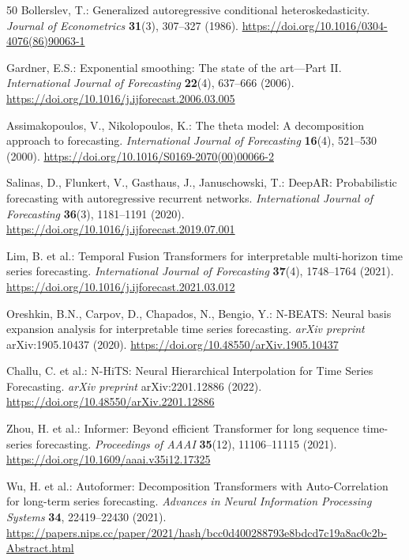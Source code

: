 \documentclass[sn-mathphys-num,pdflatex]{sn-jnl}
\begin{document}
\begin{thebibliography}{50}
Bollerslev, T.:
Generalized autoregressive conditional heteroskedasticity.
\textit{Journal of Econometrics} \textbf{31}(3), 307--327 (1986).
\url{https://doi.org/10.1016/0304-4076(86)90063-1}

Gardner, E.S.:
Exponential smoothing: The state of the art—Part II.
\textit{International Journal of Forecasting} \textbf{22}(4), 637--666 (2006).
\url{https://doi.org/10.1016/j.ijforecast.2006.03.005}

Assimakopoulos, V., Nikolopoulos, K.:
The theta model: A decomposition approach to forecasting.
\textit{International Journal of Forecasting} \textbf{16}(4), 521--530 (2000).
\url{https://doi.org/10.1016/S0169-2070(00)00066-2}

Salinas, D., Flunkert, V., Gasthaus, J., Januschowski, T.:
DeepAR: Probabilistic forecasting with autoregressive recurrent networks.
\textit{International Journal of Forecasting} \textbf{36}(3), 1181--1191 (2020).
\url{https://doi.org/10.1016/j.ijforecast.2019.07.001}

Lim, B. et al.:
Temporal Fusion Transformers for interpretable multi-horizon time series forecasting.
\textit{International Journal of Forecasting} \textbf{37}(4), 1748--1764 (2021).
\url{https://doi.org/10.1016/j.ijforecast.2021.03.012}

Oreshkin, B.N., Carpov, D., Chapados, N., Bengio, Y.:
N-BEATS: Neural basis expansion analysis for interpretable time series forecasting.
\textit{arXiv preprint} arXiv:1905.10437 (2020).
\url{https://doi.org/10.48550/arXiv.1905.10437}

Challu, C. et al.:
N-HiTS: Neural Hierarchical Interpolation for Time Series Forecasting.
\textit{arXiv preprint} arXiv:2201.12886 (2022).
\url{https://doi.org/10.48550/arXiv.2201.12886}

Zhou, H. et al.:
Informer: Beyond efficient Transformer for long sequence time-series forecasting.
\textit{Proceedings of AAAI} \textbf{35}(12), 11106--11115 (2021).
\url{https://doi.org/10.1609/aaai.v35i12.17325}

Wu, H. et al.:
Autoformer: Decomposition Transformers with Auto-Correlation for long-term series forecasting.
\textit{Advances in Neural Information Processing Systems} \textbf{34}, 22419--22430 (2021).
\url{https://papers.nips.cc/paper/2021/hash/bcc0d400288793e8bdcd7c19a8ac0c2b-Abstract.html}


\end{thebibliography}
\end{document}
